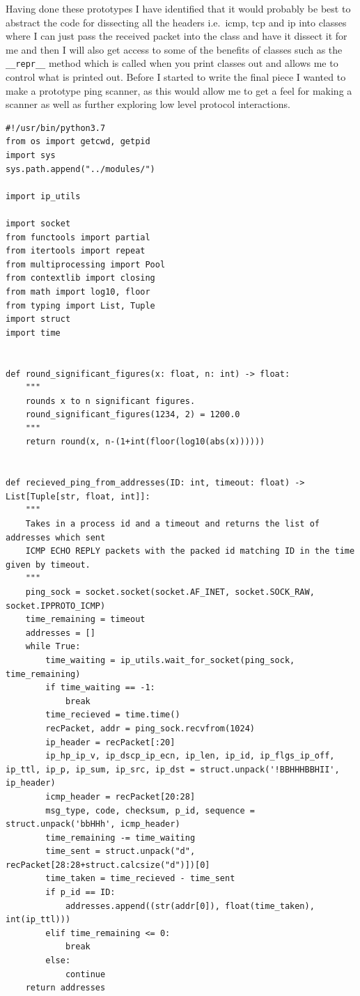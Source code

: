 \documentclass[titlepage]{article}
\begin{document}
Having done these prototypes I have identified that it would probably be best to abstract the
code for dissecting all the headers i.e.\ \gls{icmp}, \gls{tcp} and \gls{ip} into classes
where I can just pass the received packet into the class and have it dissect it for me and then
I will also get access to some of the benefits of classes such as the \verb|__repr__| method
which is called when you print classes out and allows me to control what is printed out.
Before I started to write the final piece I wanted to make a prototype ping scanner, as this
would allow me to get a feel for making a scanner as well as further exploring low level protocol
interactions.

\begin{lstlisting}[label=pingscan,caption=An attempt at making a ping scanner.]
#!/usr/bin/python3.7
from os import getcwd, getpid
import sys
sys.path.append("../modules/")

import ip_utils

import socket
from functools import partial
from itertools import repeat
from multiprocessing import Pool
from contextlib import closing
from math import log10, floor
from typing import List, Tuple
import struct
import time


def round_significant_figures(x: float, n: int) -> float:
    """
    rounds x to n significant figures.
    round_significant_figures(1234, 2) = 1200.0
    """
    return round(x, n-(1+int(floor(log10(abs(x))))))


def recieved_ping_from_addresses(ID: int, timeout: float) -> List[Tuple[str, float, int]]:
    """
    Takes in a process id and a timeout and returns the list of addresses which sent
    ICMP ECHO REPLY packets with the packed id matching ID in the time given by timeout.
    """
    ping_sock = socket.socket(socket.AF_INET, socket.SOCK_RAW, socket.IPPROTO_ICMP)
    time_remaining = timeout
    addresses = []
    while True:
        time_waiting = ip_utils.wait_for_socket(ping_sock, time_remaining)
        if time_waiting == -1:
            break
        time_recieved = time.time()
        recPacket, addr = ping_sock.recvfrom(1024)
        ip_header = recPacket[:20]
        ip_hp_ip_v, ip_dscp_ip_ecn, ip_len, ip_id, ip_flgs_ip_off, ip_ttl, ip_p, ip_sum, ip_src, ip_dst = struct.unpack('!BBHHHBBHII', ip_header)
        icmp_header = recPacket[20:28]
        msg_type, code, checksum, p_id, sequence = struct.unpack('bbHHh', icmp_header)
        time_remaining -= time_waiting
        time_sent = struct.unpack("d", recPacket[28:28+struct.calcsize("d")])[0]
        time_taken = time_recieved - time_sent
        if p_id == ID:
            addresses.append((str(addr[0]), float(time_taken), int(ip_ttl)))
        elif time_remaining <= 0:
            break
        else:
            continue
    return addresses



\end{lstlisting}
\end{document}
